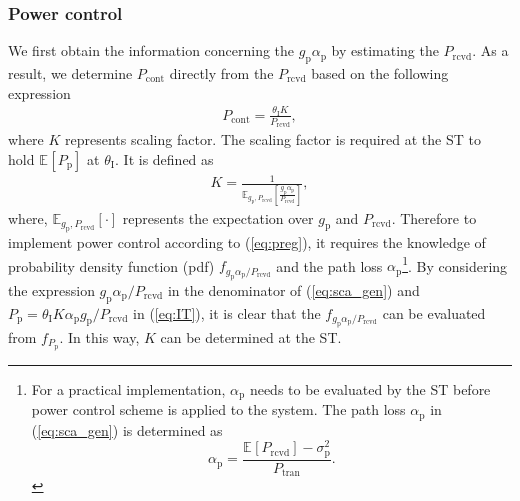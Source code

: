 \documentclass[conference, twocolumn]{IEEEtran}
\newcommand{\e}[2]{{\mathbb E}_{#1}\left[ #2 \right]}
\newcommand{\sub}[1]{_{\text{#1}}}
\newcommand{\preg}{P\sub{cont}}
\newcommand{\prcvd}{P\sub{rcvd}}
\newcommand{\ptran}{P\sub{tran}}
\newcommand{\pp}{P\sub{p}}
\newcommand{\ite}{\theta\sub{I}}
\newcommand{\gp}{g\sub{p}}
\newcommand{\gs}{g\sub{s}}
\newcommand{\ap}{\alpha\sub{p}}
\newcommand{\npp}{\sigma^2\sub{p}}
\newcommand{\dK}{f_{\gp \ap/\prcvd}}
\newcommand{\dpp}{f_{\pp}}
\begin{document}
\subsubsection*{Power control}
We first obtain the information concerning the $\gp \ap$ by estimating the $\prcvd$. As a result, we determine $\preg$ directly from the $\prcvd$ based on the following expression 
\begin{align}
\preg = \frac{\ite K}{\prcvd}, \label{eq:preg} 
\end{align}
where $K$ represents scaling factor. The scaling factor is required at the ST to hold $\e{}{\pp}$ at $\ite$. It is defined as
\begin{align}
K = \frac{1}{ \e{\gp, \prcvd}{\frac{\gp \ap}{\prcvd}}},%
\label{eq:sca_gen} 
\end{align} 
where, $\e{\gp, \prcvd}{\cdot}$ represents the expectation over $\gp$ and $\prcvd$.
Therefore to implement power control according to (\ref{eq:preg}), it requires the knowledge of probability density function (pdf) $\dK$ and the path loss $\ap$\footnote{For a practical implementation, $\ap$ needs to be evaluated by the ST before power control scheme is applied to the system. 
The path loss $\ap$ in (\ref{eq:sca_gen}) is determined as  
\begin{equation*} 
\ap = \frac{\e{}{\prcvd} - \npp}{\ptran}.
\label{eq:pl}
\end{equation*}
}.
By considering the expression $\gp \ap /\prcvd $ in the denominator of (\ref{eq:sca_gen}) and $\pp = \ite K \ap \gp / \prcvd$ in (\ref{eq:IT}), it is clear that the $\dK$ can be evaluated from $\dpp$. In this way, $K$ can be determined at the ST.
\end{document}
